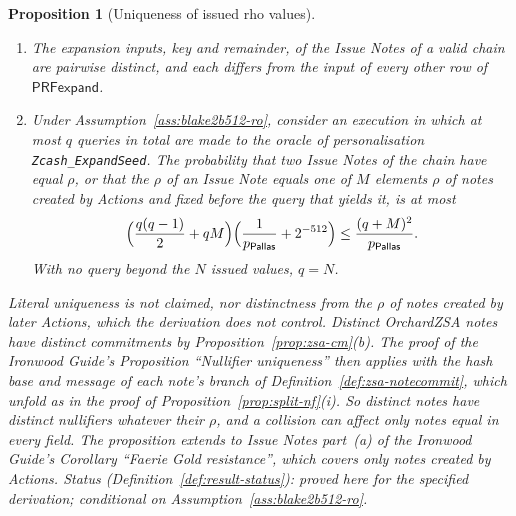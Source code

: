 \documentclass[11pt,a4paper]{article}
\newtheorem{proposition}[theorem]{Proposition}
\theoremstyle{definition}
\newcommand{\Pallas}{\ensuremath{\mathsf{Pallas}}}
\begin{document}
\begin{proposition}[Uniqueness of issued rho values]
\label{prop:issued-rho-unique}
\leavevmode
\begin{enumerate}
\item[(a)] The expansion inputs, key and remainder, of the Issue Notes of a
  valid chain are pairwise distinct, and each differs from the input of
  every other row of $\mathsf{PRFexpand}$.
\item[(b)] Under Assumption~\ref{ass:blake2b512-ro}, consider an execution
  in which at most $q$ queries in total are made to the oracle of
  personalisation \texttt{Zcash\_ExpandSeed}. The probability that two
  Issue Notes of the chain have equal $\rho$, or that the $\rho$ of an
  Issue Note equals one of $M$ elements $\rho$ of notes created by Actions
  and fixed before the query that yields it, is at most
  \[
    \Bigl(\frac{q(q-1)}{2} + qM\Bigr)\Bigl(\frac{1}{p_{\Pallas}}
      + 2^{-512}\Bigr) \le \frac{(q + M)^2}{p_{\Pallas}}.
  \]
  With no query beyond the $N$ issued values, $q = N$.
\end{enumerate}
Literal uniqueness is not claimed, nor distinctness from the $\rho$ of
notes created by later Actions, which the derivation does not control.
Distinct OrchardZSA notes have distinct commitments by
Proposition~\ref{prop:zsa-cm}(b). The proof of the \emph{Ironwood Guide}'s
Proposition ``Nullifier uniqueness'' then applies with the hash base and
message of each note's branch of Definition~\ref{def:zsa-notecommit}, which
unfold as in the proof of Proposition~\ref{prop:split-nf}(i). So distinct
notes have distinct nullifiers whatever their $\rho$, and a collision can
affect only notes equal in every field. The proposition
extends to Issue Notes part~(a) of the \emph{Ironwood Guide}'s Corollary
``Faerie Gold resistance'', which covers only notes
created by Actions. Status (Definition~\ref{def:result-status}): proved
here for the specified derivation; conditional on
Assumption~\ref{ass:blake2b512-ro}.
\end{proposition}
\end{document}
